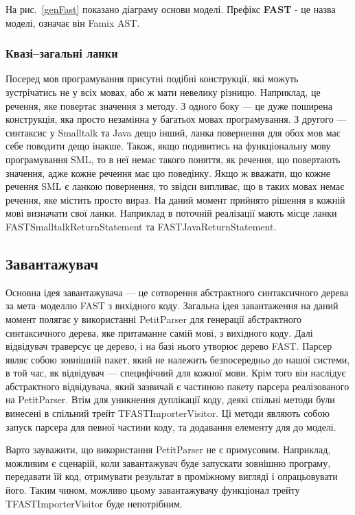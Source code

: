 \documentclass[12pt,a4paper]{article}
\begin{document}
На рис.~\ref{genFast} показано діаграму основи моделі. Префікс \textbf{FAST} - це назва моделі, означає він Famix AST.

\subsubsection{Квазі--загальні ланки}

Посеред мов програмування присутні подібні конструкції, які можуть зустрічатись не у всіх мовах, або ж мати невелику різницю. Наприклад, це речення, яке повертає значення з методу. З одного боку --- це дуже поширена конструкція, яка просто незамінна у багатьох мовах програмування. З другого --- синтаксис у Smalltalk та Java дещо інший, ланка повернення для обох мов має себе поводити дещо інакше. Також, якщо подивитись на функціональну мову програмування SML, то в неї немає такого поняття, як речення, що повертають значення, адже кожне речення має цю поведінку. Якщо ж вважати, що кожне речення SML є ланкою повернення, то звідси випливає, що в таких мовах немає речення, яке містить просто вираз. На даний момент прийнято рішення в кожній мові визначати свої ланки. Наприклад в поточній реалізації мають місце ланки FASTSmalltalkReturnStatement та FASTJavaReturnStatement.

\subsection{Завантажувач}

Основна ідея завантажувача --- це сотворення абстрактного синтаксичного дерева за мета--моделлю FAST з вихідного коду. Загальна ідея завантаження на даний момент полягає у використанні PetitParser для генерації абстрактного синтаксичного дерева, яке притаманне самій мові, з вихідного коду. Далі відвідувач траверсує це дерево, і на базі нього утворює дерево FAST. Парсер являє собою зовнішній пакет, який не належить безпосередньо до нашої системи, в той час, як відвідувач --- специфічний для кожної мови. Крім того він наслідує абстрактного відвідувача, який зазвичай є частиною пакету парсера реалізованого на PetitParser. Втім для уникнення дуплікації коду, деякі спільні методи були винесені в спільний трейт TFASTImporterVisitor. Ці методи являють собою запуск парсера для певної частини коду, та додавання елементу для до моделі.

Варто зауважити, що використання PetitParser не є примусовим. Наприклад, можливим є сценарій, коли завантажувач буде запускати зовнішню програму, передавати їй код, отримувати результат в проміжному вигляді і опрацьовувати його. Таким чином, можливо цьому завантажувачу функціонал трейту TFASTImporterVisitor буде непотрібним.
\end{document}
